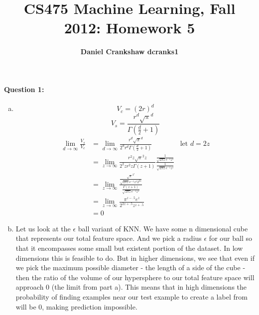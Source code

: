 \documentclass[letterpaper,11pt]{article}
\title{CS475 Machine Learning, Fall 2012: Homework 5}
\date{}
\author{\bf Daniel Crankshaw dcranks1}
\begin{document}
\maketitle

\paragraph{Question 1:}
\begin{enumerate}[(a)]
\item
\begin{equation}
V_c = (2r)^d
\end{equation}
\begin{equation}
V_s = \frac{r^d \sqrt{\pi}^d}{\Gamma (\frac{d}{2} + 1)}
\end{equation}
\begin{align}
\lim_{d \rightarrow \infty} \frac{V_s}{V_c} 
& = \lim_{d \rightarrow \infty} \frac{r^d \sqrt{\pi}^d}{2^d r^d \Gamma (\frac{d}{2} + 1)} & \text{let $d = 2z$}\\
& = \lim_{z \rightarrow \infty} \frac{r^2z \sqrt{\pi}^2z}{2^2z r^2z \Gamma (z + 1)} \frac{\frac{1}{\sqrt{2 \pi z} e^{-z} z^z}}{\frac{1}{\sqrt{2 \pi z} e^{-z} z^z}}\\
& = \lim_{z \rightarrow \infty} \frac{\frac{\sqrt{\pi}^{2^z}}{\sqrt{2 \pi z}e^{-z} z^z 2^{2z}}}{\frac{\Gamma (z + 1)}{\sqrt{2 \pi z}e^{-z} z^z}}\\
& = \lim_{z \rightarrow \infty} \frac{\pi^{z -.5} e^z}{2^{2z +.5}{z^{z +.5}}}\\
& = 0
\end{align}
\item
    Let us look at the $\epsilon$ ball variant of KNN. We have some
    n dimensional cube that represents our total feature space. And we pick
    a radius $\epsilon$ for our ball so that it encompasses some small but existent
    portion of the dataset. In low dimensions this is feasible to do. But in higher
    dimensions, we see that even if we pick the maximum possible diameter - the length
    of a side of the cube - then the ratio of the volume of our hypersphere to our total
    feature space will approach 0 (the limit from part a). This means that in high dimensions
    the probability of finding examples near our test example to create a label from will
    be 0, making prediction impossible.
\end{enumerate}
\end{document}
